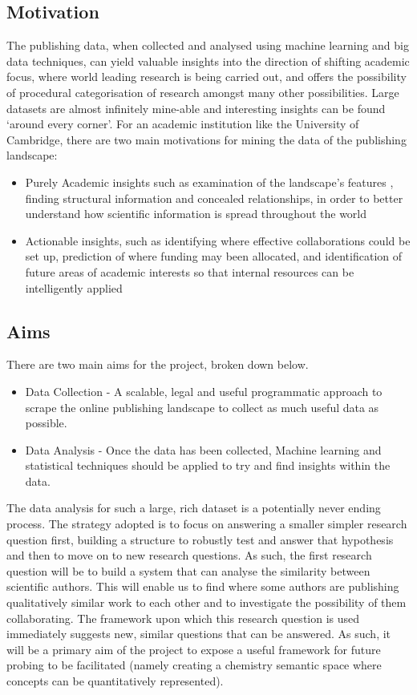\documentclass[11pt, oneside]{article}   	%
\begin{document}
\subsection{Motivation}
The publishing data, when collected and analysed using machine learning and big data techniques, can yield valuable insights into the direction of shifting academic focus, where world leading research is being carried out, and offers the possibility of procedural categorisation of research amongst many other possibilities. Large datasets are almost infinitely mine-able and interesting insights can be found `around every corner'. For an academic institution like the University of Cambridge, there are two main motivations for mining the data of the publishing landscape:
\begin{itemize}
\item{Purely Academic insights such as examination of the landscape's features , finding structural information and concealed relationships, in order to better understand how scientific information is spread throughout the world}
\item{Actionable insights, such as identifying where effective collaborations could be set up, prediction of where funding may been allocated, and identification of future areas of academic interests so that internal resources can be intelligently applied}
\end{itemize}
\subsection{Aims}
\label{sec:AIMS}
There are two main aims for the project, broken down below.
\begin{itemize}
\item{Data Collection - A scalable, legal and useful programmatic approach to scrape the online publishing landscape to collect as much useful data as possible.}
\item{Data Analysis - Once the data has been collected, Machine learning and statistical techniques should be applied to try and find insights within the data.}
\end{itemize}
The data analysis for such a large, rich dataset is a potentially never ending process. The strategy adopted is to focus on answering a smaller simpler research question first, building a structure to robustly test and answer that hypothesis and then to move on to new research questions.
As such, the first research question will be to build a system that can analyse the similarity between scientific authors. This will enable us to find where some authors are publishing qualitatively similar work to each other and to investigate the possibility of them collaborating. 
The framework upon which this research question is used immediately suggests new, similar questions that can be answered. As such, it will be a primary aim of the project to expose a useful framework for future probing to be facilitated (namely creating a chemistry semantic space where concepts can be quantitatively represented).
\end{document}
